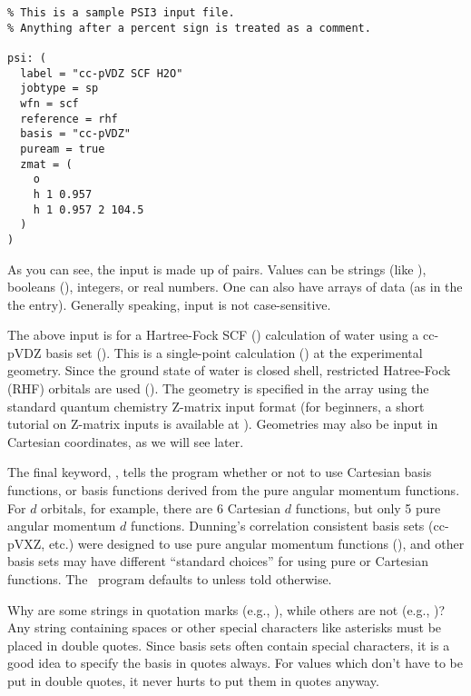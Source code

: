 \begin{verbatim}
% This is a sample PSI3 input file.
% Anything after a percent sign is treated as a comment.

psi: (
  label = "cc-pVDZ SCF H2O"
  jobtype = sp
  wfn = scf
  reference = rhf
  basis = "cc-pVDZ"
  puream = true
  zmat = (
    o
    h 1 0.957
    h 1 0.957 2 104.5
  )
)
\end{verbatim}

As you can see, the input is made up of  pairs.  
Values can be strings (like ), booleans 
(), integers, or real numbers.  One can 
also have arrays of data (as in the the  entry).  Generally
speaking, input is not case-sensitive. 

The above input is for a Hartree-Fock SCF ()
calculation of water using a cc-pVDZ basis set 
().  This is a 
single-point calculation () at the experimental 
geometry.  Since the ground state of water is closed shell, restricted 
Hatree-Fock (RHF) orbitals are used ().  
The geometry is specified in the  array using the
standard quantum chemistry Z-matrix input format (for beginners, a short
tutorial on Z-matrix inputs is available at
).  Geometries
may also be input in Cartesian coordinates, as we will see later.

The final keyword, , tells the program whether or not
to use Cartesian basis functions, or basis functions derived from the
pure angular momentum functions.  For $d$ orbitals, for example, 
there are 6 Cartesian $d$ functions, but only 5 pure angular 
momentum $d$ functions.  Dunning's correlation consistent basis sets
(cc-pVXZ, etc.) were designed to use pure angular momentum functions
(), and other basis sets may have different 
``standard choices'' for using pure or Cartesian functions.  The \PSIthree\ 
program defaults to  unless told otherwise.

Why are some strings in quotation marks (e.g., \keyword{label = "cc-pVDZ
SCF H2O"}), while others are not (e.g., \keyword{wfn = scf})?  Any
string containing spaces or other special characters like asterisks
must be placed in double quotes.  Since basis sets often contain special
characters, it is a good idea to specify the basis in quotes always.
For values which don't have to be put in double quotes, it never hurts
to put them in quotes anyway.

